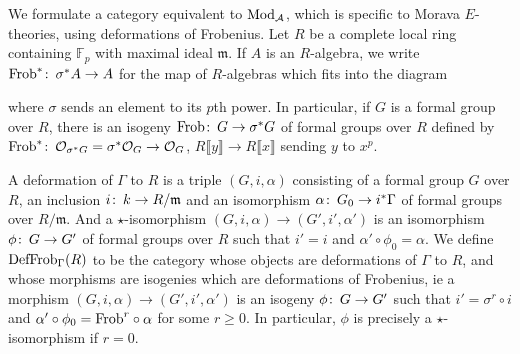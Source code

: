 \documentclass{gtpart}
\theoremstyle{definition}
\theoremstyle{remark}
\def\co{\colon\thinspace}
\newcommand{\mb}[1]{\mathbb{#1}}
\newcommand{\mf}[1]{\mathfrak{#1}}
\newcommand{\CA}{{\cal A}}
\newcommand{\Mod}{{\rm Mod}}
\newcommand{\Frob}{{\rm Frob}}
\newcommand{\CO}{{\cal O}}
\newcommand{\DF}{{{\rm DefFrob}_\Gamma}}
\begin{document}
We formulate a category equivalent to $\Mod_\CA$, which is specific 
to Morava $E$-theories, using deformations of Frobenius.  Let $R$ be 
a complete local ring containing ${\mb F}_p$ with maximal ideal $\mf m$.  
If $A$ is an $R$-algebra, we write $\Frob^*\co \sigma^*A \to A$ for 
the map of $R$-algebras which fits into the diagram 
\begin{center}
\end{center}
where $\sigma$ sends an element to its $p$th power.  In particular, 
if $G$ is a formal group over $R$, there is an isogeny 
$\Frob\co G \to \sigma^*G$ of formal groups over $R$ defined by 
$\Frob^*\co \CO_{\sigma^*G} = \sigma^*\CO_G \to \CO_G$, 
$R \llbracket y \rrbracket \to R \llbracket x \rrbracket$ sending $y$ 
to $x^p$.  

A deformation of $\Gamma$ to $R$ is a triple $(G,i,\alpha)$ 
consisting of a formal group $G$ over $R$, an inclusion 
$i\co k \to R/\mf m$ and an isomorphism $\alpha\co G_0 \to i^*\Gamma$ 
of formal groups over $R/\mf m$.  And a $\star$-isomorphism 
$(G,i,\alpha) \to (G',i',\alpha')$ is an isomorphism 
$\phi\co G \to G'$ of formal groups over $R$ such that $i' = i$ and 
$\alpha' \circ \phi_0 = \alpha$.  We define $\DF(R)$ to be the category 
whose objects are deformations of $\Gamma$ to $R$, and whose morphisms 
are isogenies which are deformations of Frobenius, ie a morphism 
$(G,i,\alpha) \to (G',i',\alpha')$ is an isogeny $\phi\co G \to G'$ 
such that $i' = \sigma^r \circ i$ and 
$\alpha' \circ \phi_0 = \Frob^r \circ \alpha$ for some $r \geq 0$.  
In particular, $\phi$ is precisely a $\star$-isomorphism if $r = 0$.  
\end{document}
